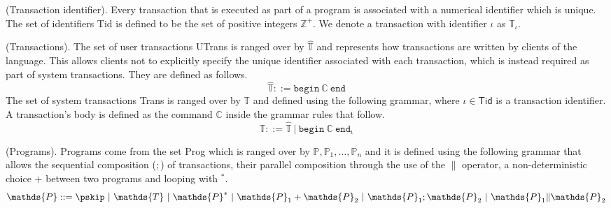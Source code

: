 \begin{defn}
	(Transaction identifier).
	Every transaction that is executed as part of a program is associated with a numerical identifier which is unique. The set of identifiers \textsf{Tid} is defined to be the set of positive integers $\mathds{Z}^+$. We denote a transaction with identifier $\iota$ as $\mathds{T}_\iota$.
\end{defn}

\begin{defn}
	(Transactions).
	The set of user transactions \textsf{UTrans} is ranged over by $\hat{\mathds{T}}$ and represents how transactions are written by clients of the language. This allows clients not to explicitly specify the unique identifier associated with each transaction, which is instead required as part of system transactions. They are defined as follows.
	\[
		\hat{\mathds{T}} ::=
			\mathtt{begin}\ \mathds{C}\ \mathtt{end}
	\]
	The set of system transactions \textsf{Trans} is ranged over by $\mathds{T}$ and defined using the following grammar, where $\iota \in \mathsf{Tid}$ is a transaction identifier. A transaction's body is defined as the command $\mathds{C}$ inside the grammar rules that follow.
	\[
		\mathds{T} ::=
			\hat{\mathds{T}}\
			|\ \mathtt{begin}\ \mathds{C}\ \mathtt{end}_\iota
	\]
\end{defn}

\begin{defn}
	(Programs).
	Programs come from the set \textsf{Prog} which is ranged over by $\mathds{P}, \mathds{P}_1, \ldots, \mathds{P}_n$ and it is defined using the following grammar that allows the sequential composition ($;$) of transactions, their parallel composition through the use of the $\|$ operator, a non-deterministic choice $+$ between two programs and looping with $^*$.
	\[
		\mathds{P} ::=
			\pskip\
			|\ \mathds{T}\
			|\ \mathds{P}^*\
			|\ \mathds{P}_1 + \mathds{P}_2\
			|\ \mathds{P}_1; \mathds{P}_2\
			|\ \mathds{P}_1 \| \mathds{P}_2
	\]
\end{defn}